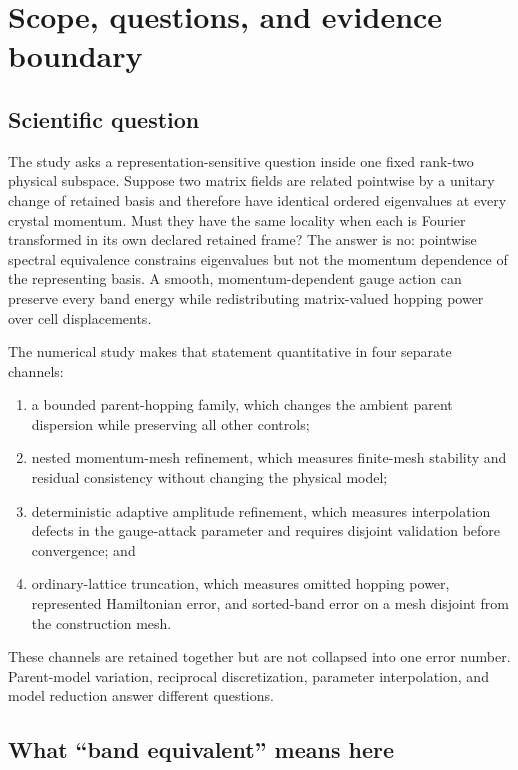 \section{Scope, questions, and evidence boundary}

\subsection{Scientific question}

The study asks a representation-sensitive question inside one fixed rank-two physical
subspace.  Suppose two matrix fields are related pointwise by a unitary change of
retained basis and therefore have identical ordered eigenvalues at every crystal
momentum.  Must they have the same locality when each is Fourier transformed in its own
declared retained frame?  The answer is no: pointwise spectral equivalence constrains
eigenvalues but not the momentum dependence of the representing basis.  A smooth,
momentum-dependent gauge action can preserve every band energy while redistributing
matrix-valued hopping power over cell displacements.

The numerical study makes that statement quantitative in four separate channels:
\begin{enumerate}
 \item a bounded parent-hopping family, which changes the ambient parent dispersion
       while preserving all other controls;
 \item nested momentum-mesh refinement, which measures finite-mesh stability and
       residual consistency without changing the physical model;
 \item deterministic adaptive amplitude refinement, which measures interpolation
       defects in the gauge-attack parameter and requires disjoint validation before
       convergence; and
 \item ordinary-lattice truncation, which measures omitted hopping power, represented
       Hamiltonian error, and sorted-band error on a mesh disjoint from the construction
       mesh.
\end{enumerate}
These channels are retained together but are not collapsed into one error number.
Parent-model variation, reciprocal discretization, parameter interpolation, and model
reduction answer different questions.

\subsection{What ``band equivalent'' means here}

